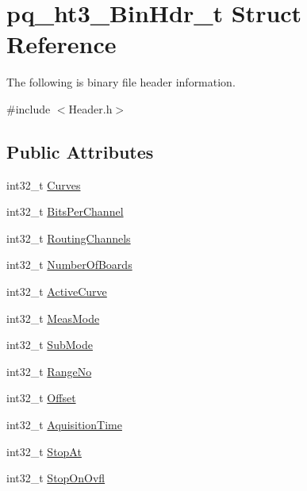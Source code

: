 \hypertarget{structpq__ht3___bin_hdr__t}{}\section{pq\+\_\+ht3\+\_\+\+Bin\+Hdr\+\_\+t Struct Reference}
\label{structpq__ht3___bin_hdr__t}


The following is binary file header information.  




{\ttfamily \#include $<$Header.\+h$>$}

\subsection*{Public Attributes}
\begin{DoxyCompactItemize}
\item 
int32\+\_\+t \hyperlink{structpq__ht3___bin_hdr__t_a2e8d5ee5e8e4d3522615e3d1295419b7}{Curves}
\item 
int32\+\_\+t \hyperlink{structpq__ht3___bin_hdr__t_a64441bf54b5b40953f999d4c9bdbaf4f}{Bits\+Per\+Channel}
\item 
int32\+\_\+t \hyperlink{structpq__ht3___bin_hdr__t_a3624a60c13696e6cdfc081a0c20b7a65}{Routing\+Channels}
\item 
int32\+\_\+t \hyperlink{structpq__ht3___bin_hdr__t_a02f85e2c1336b2c37f51bc92580e95f3}{Number\+Of\+Boards}
\item 
int32\+\_\+t \hyperlink{structpq__ht3___bin_hdr__t_ab9c5f8bc82e787769d011055d370f20e}{Active\+Curve}
\item 
int32\+\_\+t \hyperlink{structpq__ht3___bin_hdr__t_abc3d90296f588402c242052485b6b146}{Meas\+Mode}
\item 
int32\+\_\+t \hyperlink{structpq__ht3___bin_hdr__t_aa13b5295313e4959e214bbeffc09b9e7}{Sub\+Mode}
\item 
int32\+\_\+t \hyperlink{structpq__ht3___bin_hdr__t_ae7b50c41f030d2e174b98e7cd82ed16a}{Range\+No}
\item 
int32\+\_\+t \hyperlink{structpq__ht3___bin_hdr__t_ad80bb54db19305e38492f0341d232a18}{Offset}
\item 
int32\+\_\+t \hyperlink{structpq__ht3___bin_hdr__t_a5d101c00431d2941fdc2e23fdb7f346f}{Aquisition\+Time}
\item 
int32\+\_\+t \hyperlink{structpq__ht3___bin_hdr__t_a6e182c15c473a720e4c1e3bccb54872b}{Stop\+At}
\item 
int32\+\_\+t \hyperlink{structpq__ht3___bin_hdr__t_af9e45f8d6d7964ca54d4c602e9f715da}{Stop\+On\+Ovfl}

\end{DoxyCompactItemize}
